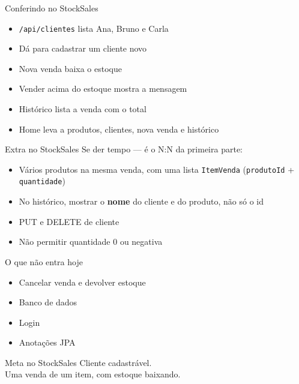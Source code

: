 \documentclass[aspectratio=169,11pt]{beamer}
\begin{document}
\begin{frame}{Conferindo no StockSales}
  \begin{itemize}
    \item [ ] \texttt{/api/clientes} lista Ana, Bruno e Carla
    \item [ ] Dá para cadastrar um cliente novo
    \item [ ] Nova venda baixa o estoque
    \item [ ] Vender acima do estoque mostra a mensagem
    \item [ ] Histórico lista a venda com o total
    \item [ ] Home leva a produtos, clientes, nova venda
          e histórico
  \end{itemize}
\end{frame}

\begin{frame}{Extra no StockSales}
  Se der tempo --- é o N{:}N da primeira parte:

  \vspace{0.4em}
  \begin{itemize}
    \item Vários produtos na mesma venda, com uma lista
          \texttt{ItemVenda} (\texttt{produtoId} + \texttt{quantidade})
    \item No histórico, mostrar o \textbf{nome} do cliente
          e do produto, não só o id
    \item PUT e DELETE de cliente
    \item Não permitir quantidade 0 ou negativa
  \end{itemize}
\end{frame}

\begin{frame}{O que não entra hoje}
  \begin{itemize}
    \item Cancelar venda e devolver estoque
    \item Banco de dados
    \item Login
    \item Anotações JPA
  \end{itemize}

  \vspace{0.5em}
  \begin{block}{Meta no StockSales}
    Cliente cadastrável.\\
    Uma venda de um item, com estoque baixando.
  \end{block}
\end{frame}
\end{document}
